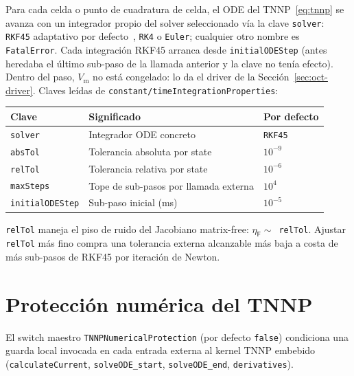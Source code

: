 \documentclass[11pt,a4paper]{article}
\newcommand{\code}[1]{\texttt{\small #1}}
\newcommand{\Vm}{V_{\text{m}}}
\newcommand{\Fres}{\mathsf{F}}
\begin{document}
Para cada celda o punto de cuadratura de celda, el ODE del TNNP~\eqref{eq:tnnp} se
avanza con un integrador propio del solver seleccionado vía la clave
\code{solver}: \code{RKF45} adaptativo por defecto~\cite{hairer2}, \code{RK4} o
\code{Euler}; cualquier otro nombre es \code{FatalError}. Cada integración RKF45
arranca desde \code{initialODEStep} (antes heredaba el último sub-paso de la
llamada anterior y la clave no tenía efecto). Dentro del paso, $\Vm$ no está
congelado: lo da el driver de la Sección~\ref{sec:oct-driver}. Claves leídas de
\code{constant/timeIntegrationProperties}:

\begin{center}
\begin{tabular}{@{}lll@{}}
\toprule
Clave & Significado & Por defecto \\
\midrule
\code{solver} & Integrador ODE concreto & \code{RKF45} \\
\code{absTol} & Tolerancia absoluta por state & $10^{-9}$ \\
\code{relTol} & Tolerancia relativa por state & $10^{-6}$ \\
\code{maxSteps} & Tope de sub-pasos por llamada externa & $10^{4}$ \\
\code{initialODEStep} & Sub-paso inicial (ms) & $10^{-5}$ \\
\bottomrule
\end{tabular}
\end{center}

\code{relTol} maneja el piso de ruido del Jacobiano matrix-free:
$\eta_{\Fres} \sim $~\code{relTol}. Ajustar \code{relTol} más fino compra una
tolerancia externa alcanzable más baja a costa de más sub-pasos de RKF45 por
iteración de Newton.

\section{Protección numérica del TNNP}

El switch maestro \code{TNNPNumericalProtection} (por defecto \code{false})
condiciona una guarda local invocada en cada entrada externa al kernel TNNP embebido
(\code{calculateCurrent}, \code{solveODE\_start}, \code{solveODE\_end},
\code{derivatives}).
\end{document}
